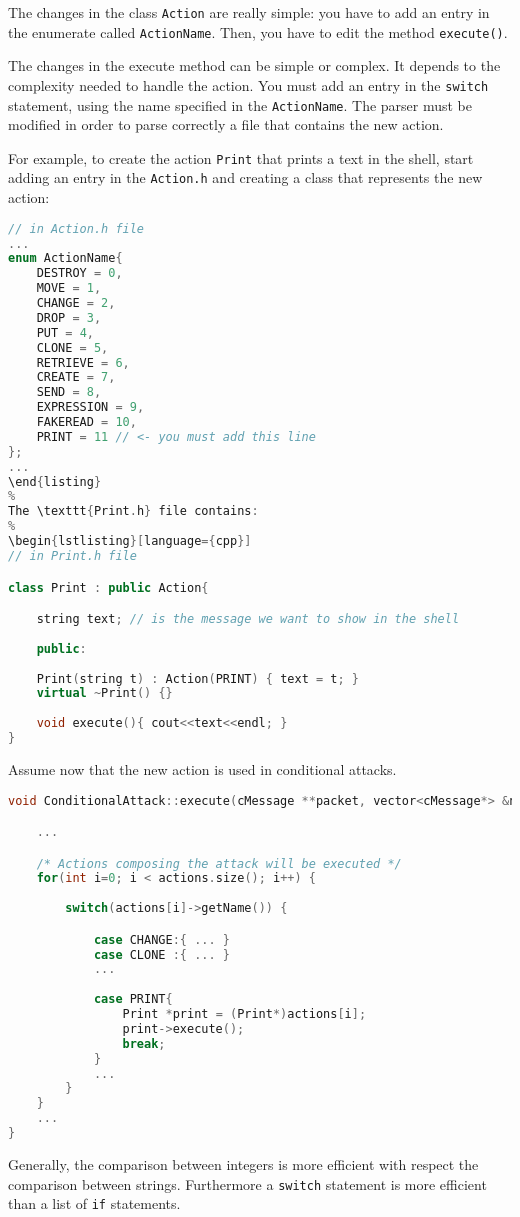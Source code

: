The changes in the class \texttt{Action} are really simple: you have to add an entry in the enumerate called \texttt{ActionName}. Then, you have to edit the method \texttt{execute()}.

The changes in the execute method can be simple or complex. It depends to the complexity needed to handle the action. You must add an entry in the \texttt{switch} statement, using the name specified in the \texttt{ActionName}. The parser must be modified in order to parse correctly a file that contains the new action.

For example, to create the action \texttt{Print} that prints a text in the shell, start adding an entry in the \texttt{Action.h} and creating a class that represents the new action:
%
\begin{lstlisting}[language={cpp}]
// in Action.h file
...
enum ActionName{
	DESTROY = 0,
	MOVE = 1,
	CHANGE = 2,
	DROP = 3,
	PUT = 4,
	CLONE = 5,
	RETRIEVE = 6,
	CREATE = 7,
	SEND = 8,
	EXPRESSION = 9,
	FAKEREAD = 10,
	PRINT = 11 // <- you must add this line
};
...
\end{listing}
%
The \texttt{Print.h} file contains:
%
\begin{lstlisting}[language={cpp}]
// in Print.h file

class Print : public Action{

	string text; // is the message we want to show in the shell
    
	public:
	  
	Print(string t) : Action(PRINT) { text = t; }
	virtual ~Print() {}
	
	void execute(){ cout<<text<<endl; }
}
\end{lstlisting}
%
Assume now that the new action is used in conditional attacks.
%
\begin{lstlisting}[language={cpp}]
void ConditionalAttack::execute(cMessage **packet, vector<cMessage*> &new_messages){

	...

	/* Actions composing the attack will be executed */
	for(int i=0; i < actions.size(); i++) {
	 
		switch(actions[i]->getName()) {

			case CHANGE:{ ... }
			case CLONE :{ ... }
			...
				
			case PRINT{
				Print *print = (Print*)actions[i]; 
				print->execute();
				break;			
			}
			...
		}
	}
	...
} 
\end{lstlisting}
%
Generally, the comparison between integers is more efficient with respect the comparison between strings. Furthermore a \texttt{switch} statement is more efficient than a list of \texttt{if} statements.

